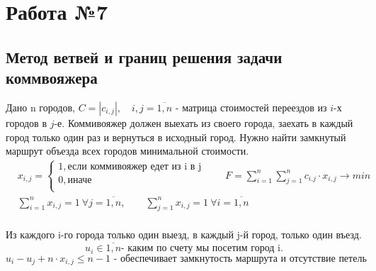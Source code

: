 \documentclass[17pt]{extarticle}
\begin{document}
\section*{Работа №7}
\subsection*{Метод ветвей и границ решения задачи коммвояжера}
Дано n городов, $C = \left| c_{i,j} \right|, \quad i, j = \overline{1, n}$ - матрица стоимостей переездов из $i$-х городов в $j$-е. Коммивояжер должен выехать из своего города, заехать в каждый город только один раз и вернуться в исходный город. Нужно найти замкнутый маршрут объезда всех городов минимальной стоимости.
\[
    \begin{aligned}
         & x_{i,j} = \begin{cases} 1, \text{если коммивояжер едет из i в j} \\ 0, \text{иначе} \\ \end{cases}
        \qquad F=\sum_{i=1}^n \sum_{j=1}^n c_{i.j} \cdot x_{i,j} \rightarrow min                              \\
         & \sum_{i=1}^n x_{i,j} = 1 \ \forall j=\overline{1,n}, \qquad
        \sum_{j=1}^n x_{i,j} = 1 \ \forall i=\overline{1,n}                                                   \\
    \end{aligned}
\]

Из каждого i-го города только один выезд, в каждый j-й город, только один въезд.
\[u_i \in \overline{1,n} \text{- каким по счету мы посетим город i.}\]
\[u_i-u_j + n \cdot x_{i,j} \leq n - 1 \text{ - обеспечивает замкнутость маршрута и отсутствие петель}\]
\end{document}
